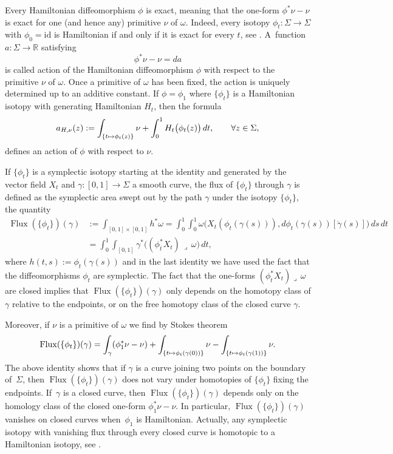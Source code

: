 \documentclass[JEP,XML,SOM,Unicode,published]{cedram}
\let\mathds\mathbb
\newcommand\mto{\mathchoice{\longmapsto}{\mapsto}{\mapsto}{\mapsto}}
\theoremstyle{definition}
\DeclareMathOperator{\Flux}{\mathrm{Flux}}
\newcommand{\R}{\mathds{R}}
\begin{document}
Every Hamiltonian diffeomorphism $\phi$ is exact, meaning that the one-form $\phi^* \nu - \nu$ is exact for one (and hence any) primitive $\nu$ of $\omega$. Indeed, every isotopy $\phi_t: \Sigma \to \Sigma$ with $\phi_0=\mathrm{id}$ is Hamiltonian if and only if it is exact for every $t$, see \cite[Prop.\,9.3.1]{McDuff:1998uu}. A~function $a: \Sigma \to \R$ satisfying
\[
\phi^* \nu - \nu = da
\]
is called action of the Hamiltonian diffeomorphism $\phi$ with respect to the primitive $\nu$ of $\omega$. Once a primitive of $\omega$ has been fixed, the action is uniquely determined up to an additive constant. If $\phi=\phi_1$ where $\{\phi_t\}$ is a Hamiltonian isotopy with generating Hamiltonian $H_t$, then the formula
\begin{equation}
\label{canaction}
a_{H,\nu}(z) := \int_{\{t\mto \phi_t(z)\}} \nu + \int_0^1 H_t \bigl(\phi_t(z)\bigr)\, dt, \qquad \forall z\in \Sigma,
\end{equation}
defines an action of $\phi$ with respect to $\nu$.

If $\{\phi_t\}$ is a symplectic isotopy starting at the identity and generated by the vector field $X_t$ and $\gamma: [0,1] \to \Sigma$ a smooth curve, the flux of $\{\phi_t\}$ through $\gamma$ is defined as the symplectic area swept out by the path $\gamma$ under the isotopy $\{\phi_t\}$, \ie the quantity
\[
\begin{split}
\Flux(\{\phi_t\})(\gamma) &:= \int_{[0,1]\times [0,1]} h^* \omega = \int_0^1 \int_0^1 \omega\bigl(X_t(\phi_t(\gamma(s))),d\phi_t(\gamma(s)) [ \dot{\gamma}(s) ] \bigr)\, ds \, dt \\ &= \int_0^1 \int_{[0,1]} \gamma^* \bigl( (\phi_t^* X_t) \,\lrcorner\, \omega \bigr)\, dt,
\end{split}
\]
where $h(t,s) := \phi_t(\gamma(s))$ and in the last identity we have used the fact that the diffeomorphisms $\phi_t$ are symplectic. The fact that the one-forms $(\phi_t^*X_t)\lrcorner\,\omega$ are closed implies that $\Flux(\{\phi_t\})(\gamma)$ only depends on the homotopy class of $\gamma$ relative to the endpoints, or on the free homotopy class of the closed curve $\gamma$.

Moreover, if $\nu$ is a primitive of $\omega$ we find by Stokes theorem
\[
\Flux(\{\phi_t\})(\gamma) = \int_{\gamma} (\phi_1^* \nu-\nu) + \int_{\{t \mto \phi_t(\gamma(0))\}} \nu - \int_{\{t \mto \phi_t(\gamma(1))\}} \nu.
\]
The above identity shows that if $\gamma$ is a curve joining two points on the boundary of~$\Sigma$, then $\Flux(\{\phi_t\})(\gamma)$ does not vary under homotopies of $\{\phi_t\}$ fixing the endpoints. If~$\gamma$ is a closed curve, then $\Flux(\{\phi_t\})(\gamma)$ depends only on the homology class of the closed one-form $\phi_1^* \nu - \nu$. In particular, $\Flux(\{\phi_t\})(\gamma)$ vanishes on closed curves when~$\phi_1$ is Hamiltonian. Actually, any symplectic isotopy with vanishing flux through every closed curve is homotopic to a Hamiltonian isotopy, see \cite[Th.\,10.2.5]{McDuff:1998uu}.
\end{document}
